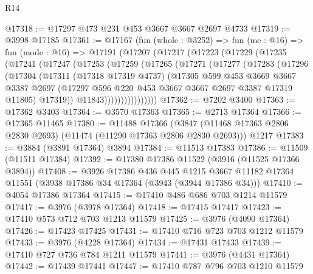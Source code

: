 \begin{lexlean}{R14}
\begin{coremodule}
@17318 := @17297 @473 @231 @453 @3667 @3667 @2697 @4733
@17319 := @3998 @17185
@17361 := @17167
    (fun (whole : @3252) =>
    fun (me : @16) =>
    fun (mode : @16) =>
    @17191
      (@17207
        (@17217
          (@17223
            (@17229
              (@17235
                (@17241
                  (@17247
                    (@17253
                      (@17259
                        (@17265
                          (@17271
                            (@17277
                              (@17283
                                (@17296
                                  (@17304
                                    (@17311
                                      (@17318 @17319 @4737)
                                      (@17305
                                        @599
                                        @453
                                        @3669
                                        @3667
                                        @3387
                                        @2697
                                        (@17297
                                          @596
                                          @220
                                          @453
                                          @3667
                                          @3667
                                          @2697
                                          @3387
                                          @17319
                                          @11805)
                                        @17319))
                                    @11843))))))))))))))))
@17362 := @7202 @3400
@17363 := @17362 @3403
@17364 := @3570 @17363
@17365 := @2713 @17364
@17366 := @17365 @11465
@17380 := @11488
    @17366
    (@3847 (@11468 @17363 @2806 @2830 @2693) (@11474 (@11290 @17363 @2806 @2830 @2693)))
    @1217
@17383 := @3884 (@3891 @17364) @3894
@17384 := @11513 @17383
@17386 := @11509 (@11511 @17384)
@17392 := @17380 @17386 @11522 (@3916 (@11525 @17366 @3894))
@17408 := @3926
    @17386
    @436
    @445
    @1215
    @3667
    @11182
    @17364
    @11551
    (@3938 @17386 @34 @17364 (@3943 (@3944 @17386 @34)))
@17410 := @4054 @17386 @17364
@17415 := @17410 @486 @686 @703 @1214 @11579
@17417 := @3976 (@3978 @17364)
@17418 := @17415 @17417
@17423 := @17410 @573 @712 @703 @1213 @11579
@17425 := @3976 (@4090 @17364)
@17426 := @17423 @17425
@17431 := @17410 @716 @723 @703 @1212 @11579
@17433 := @3976 (@4228 @17364)
@17434 := @17431 @17433
@17439 := @17410 @727 @736 @784 @1211 @11579
@17441 := @3976 (@4431 @17364)
@17442 := @17439 @17441
@17447 := @17410 @787 @796 @703 @1210 @11579

\end{coremodule}
\end{lexlean}
